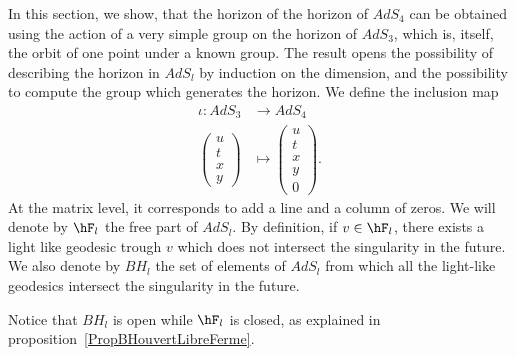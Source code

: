 	In this section, we show, that the horizon of the horizon of $AdS_4$ can be obtained using the action of a very simple group on the horizon of $AdS_3$, which is, itself, the orbit of one point under a known group. The result opens the possibility of describing the horizon in $AdS_l$ by induction on the dimension, and the possibility to compute the group which generates the horizon.  We define the inclusion map
	\begin{equation}
		\begin{aligned}
			\iota\colon AdS_3 & \to AdS_4            \\
			\begin{pmatrix}
				u \\
				t \\
				x \\
				y
			\end{pmatrix}   & \mapsto \begin{pmatrix}
				                          u \\
				                          t \\
				                          x \\
				                          y \\
				                          0
			                          \end{pmatrix}.
		\end{aligned}
	\end{equation}
	At the matrix level, it corresponds to add a line and a column of zeros. We will denote by $\hF_l$ the free part of $AdS_l$. By definition, if $v\in\hF_l$, there exists a light like geodesic trough $v$ which does not intersect the singularity in the future. We also denote by $BH_l$ the set of elements of $AdS_l$ from which all the light-like geodesics intersect the singularity in the future.

	Notice that $BH_l$ is open while $\hF_l$ is closed, as explained in proposition~\ref{PropBHouvertLibreFerme}.

